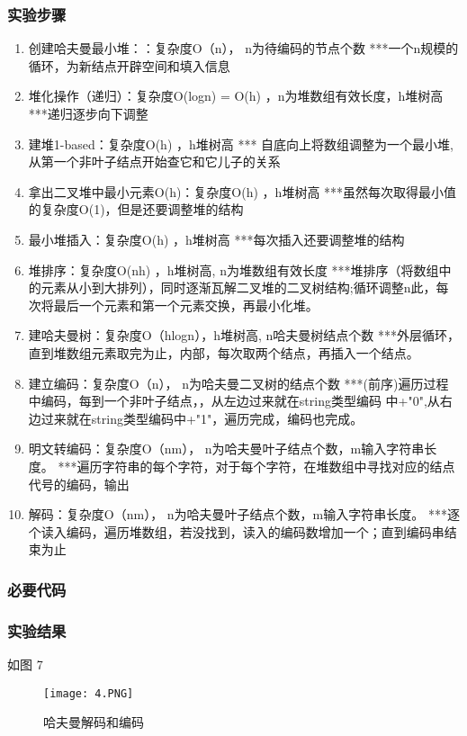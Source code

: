 \subsubsection{实验步骤}
\begin{enumerate}
\item 创建哈夫曼最小堆：：复杂度O（n）， n为待编码的节点个数     ***一个n规模的循环，为新结点开辟空间和填入信息
\item 堆化操作（递归）：复杂度O(logn) = O(h) ，n为堆数组有效长度，h堆树高    ***递归逐步向下调整
\item 建堆1-based：复杂度O(h) ，h堆树高     *** 自底向上将数组调整为一个最小堆,从第一个非叶子结点开始查它和它儿子的关系
\item 拿出二叉堆中最小元素O(h)：复杂度O(h) ，h堆树高  ***虽然每次取得最小值的复杂度O(1)，但是还要调整堆的结构
\item 最小堆插入：复杂度O(h) ，h堆树高  ***每次插入还要调整堆的结构
\item 堆排序：复杂度O(nh) ，h堆树高, n为堆数组有效长度  ***堆排序（将数组中的元素从小到大排列），同时逐渐瓦解二叉堆的二叉树结构;循环调整n此，每次将最后一个元素和第一个元素交换，再最小化堆。
\item 建哈夫曼树：复杂度O（hlogn），h堆树高, n哈夫曼树结点个数     ***外层循环，直到堆数组元素取完为止，内部，每次取两个结点，再插入一个结点。
\item 建立编码：复杂度O（n）， n为哈夫曼二叉树的结点个数     ***(前序)遍历过程中编码，每到一个非叶子结点，，从左边过来就在string类型编码
中+"0",从右边过来就在string类型编码中+"1"，遍历完成，编码也完成。
\item 明文转编码：复杂度O（nm）， n为哈夫曼叶子结点个数，m输入字符串长度。    ***遍历字符串的每个字符，对于每个字符，在堆数组中寻找对应的结点代号的编码，输出
\item 解码：复杂度O（nm）， n为哈夫曼叶子结点个数，m输入字符串长度。    ***逐个读入编码，遍历堆数组，若没找到，读入的编码数增加一个；直到编码串结束为止

\end{enumerate}
\subsubsection{必要代码}



\subsubsection{实验结果}如图 7
	\begin{figure}[!bthp]
	\centering
        \texttt{[image: 4.PNG]}
        \caption{哈夫曼解码和编码}
      \end{figure}


